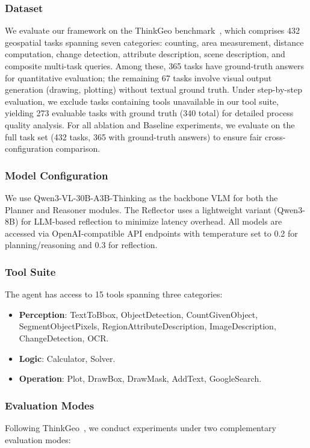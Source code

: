 \documentclass[journal]{IEEEtran}
\begin{document}
\subsubsection{Dataset}
We evaluate our framework on the ThinkGeo benchmark~\cite{ThinkGeo}, which comprises 432 geospatial tasks spanning seven categories: counting, area measurement, distance computation, change detection, attribute description, scene description, and composite multi-task queries.
Among these, 365 tasks have ground-truth answers for quantitative evaluation; the remaining 67 tasks involve visual output generation (drawing, plotting) without textual ground truth.
Under step-by-step evaluation, we exclude tasks containing tools unavailable in our tool suite, yielding 273 evaluable tasks with ground truth (340 total) for detailed process quality analysis.
For all ablation and Baseline experiments, we evaluate on the full task set (432 tasks, 365 with ground-truth answers) to ensure fair cross-configuration comparison.

\subsubsection{Model Configuration}
We use Qwen3-VL-30B-A3B-Thinking as the backbone VLM for both the Planner and Reasoner modules.
The Reflector uses a lightweight variant (Qwen3-8B) for LLM-based reflection to minimize latency overhead.
All models are accessed via OpenAI-compatible API endpoints with temperature set to 0.2 for planning/reasoning and 0.3 for reflection.

\subsubsection{Tool Suite}
The agent has access to 15 tools spanning three categories:
\begin{itemize}[leftmargin=*]
    \item \textbf{Perception}: TextToBbox, ObjectDetection, CountGivenObject, SegmentObjectPixels, RegionAttributeDescription, ImageDescription, ChangeDetection, OCR.
    \item \textbf{Logic}: Calculator, Solver.
    \item \textbf{Operation}: Plot, DrawBox, DrawMask, AddText, GoogleSearch.
\end{itemize}

\subsubsection{Evaluation Modes}
Following ThinkGeo~\cite{ThinkGeo}, we conduct experiments under two complementary evaluation modes:
\end{document}
